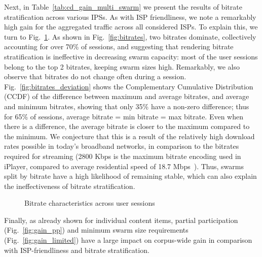 \documentclass[10pt, conference, letterpaper]{IEEEtran}
\newcommand\fref[1]{Fig.~\ref{#1}}
\begin{document}
Next, in Table~\ref{tab:cd_gain_multi_swarm} we present the results of bitrate stratification across various IPSs. As with ISP friendliness, we note a remarkably high gain for the aggregated traffic across all considered ISPs. To explain this, we turn to \fref{fig:bitrate_char}. As shown in \fref{fig:bitrates}, two bitrates dominate, collectively accounting for over 70\% of sessions, and suggesting that rendering bitrate stratification is ineffective in decreasing swarm capacity: most of the user sessions belong to the top 2 bitrates, keeping swarm sizes high. Remarkably, we also observe that bitrates do not change often during a session. \fref{fig:bitrates_deviation} shows the Complementary Cumulative Distribution (CCDF) of the difference between maximum and average bitrates, and average and minimum bitrates, showing that only 35\% have a non-zero difference; thus for 65\% of sessions, average bitrate = min bitrate = max bitrate. Even when there is a difference, the average bitrate is closer to the maximum compared to the minimum. We conjecture that this is a result of the relatively high download rates possible in today's broadband networks, in comparison to the bitrates required for streaming (2800 Kbps is the maximum bitrate encoding used in iPlayer, compared to average residential speed of 18.7 Mbps~\cite{ofcom2014speed}). Thus, swarms split by bitrate have a high likelihood of remaining stable, which can also explain the ineffectiveness of bitrate stratification.

\begin{figure}
\vspace{-8mm}
\hspace{1em}
\caption{Bitrate characteristics across user sessions}\vspace{-4mm}
\label{fig:bitrate_char}
\end{figure}

Finally, as already shown for individual content items, partial participation (\fref{fig:gain_pp}) and minimum swarm size requirements (\fref{fig:gain_limited}) have a large impact on corpus-wide gain in comparison with ISP-friendliness and bitrate stratification. 
\end{document}
